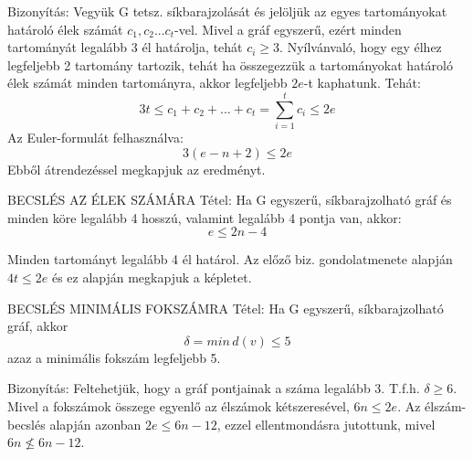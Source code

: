 \documentclass[]{article}
\begin{document}
\begin{leftbar}
Bizonyítás: Vegyük G tetsz. síkbarajzolását és jelöljük az egyes tartományokat határoló élek számát $c_1, c_2...c_t$-vel. Mivel a gráf egyszerű, ezért minden tartományát legalább 3 él határolja, tehát $c_i \geq 3$. Nyílvánvaló, hogy egy élhez legfeljebb 2 tartomány tartozik, tehát ha összegezzük a tartományokat határoló élek számát minden tartományra, akkor legfeljebb $2e$-t kaphatunk. Tehát:
$$3t \leq c_1 + c_2 + ... + c_t = \sum_{i=1}^{t} c_i \leq 2e$$
Az Euler-formulát felhasználva:
$$3(e - n + 2) \leq 2e$$
Ebből átrendezéssel megkapjuk az eredményt.
\end{leftbar}
\begin{framed}
BECSLÉS AZ ÉLEK SZÁMÁRA Tétel: Ha G egyszerű, síkbarajzolható gráf és minden köre legalább 4 hosszú, valamint legalább 4 pontja van, akkor:
$$e \leq 2n - 4$$
\end{framed}
\begin{leftbar}
Minden tartományt legalább 4 él határol. Az előző biz. gondolatmenete alapján $4t \leq 2e$ és ez alapján megkapjuk a képletet.
\end{leftbar}
\begin{framed}
BECSLÉS MINIMÁLIS FOKSZÁMRA Tétel: Ha G egyszerű, síkbarajzolható gráf, akkor $$\delta = min\, d(v) \leq 5$$ azaz a minimális fokszám legfeljebb 5.
\end{framed}
\begin{leftbar}
Bizonyítás: Feltehetjük, hogy a gráf pontjainak a száma legalább 3. T.f.h. $\delta \geq 6$. Mivel a fokszámok összege egyenlő az élszámok kétszeresével, $6n \leq 2e$. Az élszám-becslés alapján azonban $2e \leq 6n - 12$, ezzel ellentmondásra jutottunk, mivel $6n \not\leq 6n - 12$.
\end{leftbar}
\end{document}
